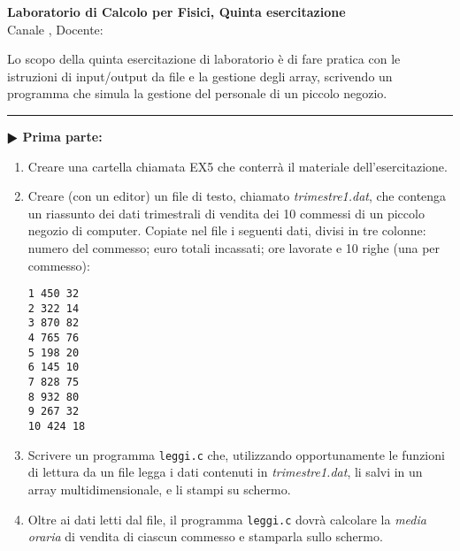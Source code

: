 \documentclass[11pt]{article}
\begin{document}
\pagestyle{empty}

\begin{center}
{\Large \bf  Laboratorio di Calcolo per Fisici, Quinta esercitazione\\[2mm]}
{\large Canale \canale, Docente: \docente}
\end{center}
\vspace{4mm}

\begin{mdframed}[backgroundcolor=panna]
  Lo scopo della quinta esercitazione di laboratorio \`e di fare pratica con
le istruzioni di input/output da file e la gestione degli array, scrivendo un programma
che simula la gestione del personale di un piccolo negozio.
  \end{mdframed}
%
%



\hrule
\vspace{2mm}
\textbf{$\RHD$ Prima parte:}
\begin{enumerate}
\item Creare una cartella chiamata EX5 che conterr\`{a} il materiale dell'esercitazione.
\item Creare (con un editor) un file di testo, chiamato {\em trimestre1.dat}, che 
contenga un riassunto dei dati trimestrali di vendita dei 10 commessi di
un piccolo negozio di computer. Copiate nel file i seguenti dati, divisi in tre colonne: numero del commesso;  euro totali incassati; ore lavorate e
10 righe (una per commesso):
\begin{mdframed}[backgroundcolor=panna]
\texttt{1    450   32\\
2    322   14\\
3    870   82\\
4    765   76\\
5    198   20\\
6    145   10\\
7    828   75\\
8    932   80\\
9    267   32\\
10   424   18}
\end{mdframed}

\item Scrivere un programma \texttt{leggi.c} che, utilizzando opportunamente le funzioni di lettura da un file 
legga i dati contenuti in {\em trimestre1.dat}, li salvi in un array multidimensionale, e li stampi su schermo.

\item Oltre ai dati letti dal file, il programma \texttt{leggi.c} dovrà
calcolare la {\em media oraria\/} di vendita di ciascun commesso e stamparla sullo schermo.
\end{enumerate}
\end{document}
